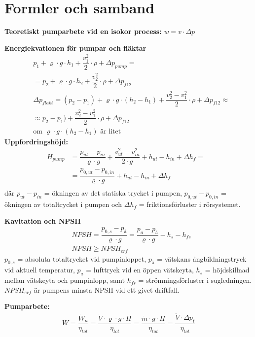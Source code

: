 \section*{Formler och samband}
	\textbf{Teoretiskt pumparbete vid en isokor process: } $w=v \cdot \Delta p$ \par
\textbf{Energiekvationen för pumpar och fläktar}  
	\begin{align*}
    & p_1 + \varrho \cdot g \cdot h_1 + \dfrac{v_1^2}{2} \cdot \rho +  \Delta p_{pump} = \\ 
    & = p_2 + \varrho \cdot g \cdot h_2 + \dfrac{v_2^2}{2} \cdot \rho +  \Delta p_{f12} \\
		& \Delta p_{flakt} = (p_2 - p_1) + \varrho \cdot g \cdot( h_2 -  h_1) + \dfrac{v_2^2-v_1^2}{2} \cdot \rho +  \Delta p_{f12} \approx \\
		&\approx p_2 - p_1) +  \dfrac{v_2^2-v_1^2}{2} \cdot \rho +  \Delta p_{f12} \\
		&\text{om }\varrho \cdot g \cdot( h_2 -  h_1) \text{ är litet}
	\end{align*}
\textbf{Uppfordringshöjd:} 
	\begin{align*}
    H_{pump} & = \dfrac{p_{ut}-p_{in}}{\varrho \cdot g}+\dfrac{v^2_{ut}-v^2_{in}}{2\cdot g}+h_{ut}-h_{in} + \Delta h_f = &\\
    				 & = \dfrac{p_{0,ut}-p_{0,in}}{\varrho \cdot g}+h_{ut}-h_{in} + \Delta h_f \\
	\end{align*}
där $p_{ut}-p_{in}$ = ökningen av det statiska trycket i pumpen, $p_{0,ut}-p_{0,in}$ = ökningen av totaltrycket i pumpen och $\Delta h_f$ = friktionsförluster i rörsystemet. \par
\textbf{Kavitation och NPSH}
 \begin{align*}
	& \textit{NPSH} = \dfrac{p_{0,s} - p_\text{å}}{\varrho \cdot g} = \dfrac{p_a - p_\text{å}}{\varrho \cdot g} - h_s - h_{fs} \\
	&	\textit{NPSH} \geq \textit{NPSH}_{erf}
 \end{align*}
$p_{0,s}$ = absoluta totaltrycket vid pumpinloppet, $p_\text{å}$ = vätskans ångbildningstryck vid aktuell temperatur, $p_a$ = lufttryck vid en öppen vätskeyta, $h_s$ = höjdskillnad mellan vätskeyta och pumpinlopp, samt $h_{fs}$ = strömningsförluster i sugledningen. $\textit{NPSH}_{erf}$ är pumpens minsta NPSH vid ett givet driftfall.\par
	\textbf{Pumparbete: }
	\begin{align*}
    & \dot{W} = \dfrac{\dot{W}_n}{\eta_{tot}} = \dfrac{\dot{V}\cdot \varrho \cdot g \cdot{H}}{\eta_{tot}}= \dfrac{\dot{m}\cdot g \cdot H }{\eta_{tot}}=  
    \dfrac{\dot{V}\cdot\Delta p_t}{\eta_{tot}} & 
	\end{align*}
